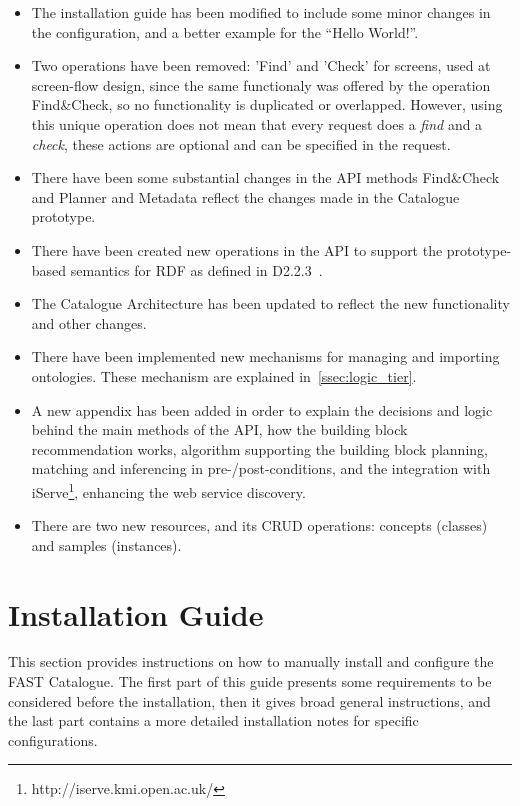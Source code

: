 \documentclass{fast_latex}
\begin{document}
\begin{itemize}
 \item The installation guide has been modified to include some minor changes in the configuration, and a better example for the ``Hello World!''.
 \item Two operations have been removed: 'Find' and 'Check' for screens, used at screen-flow design, since the same functionaly was offered by the operation Find\&Check, so no functionality is duplicated or overlapped. However, using this unique operation does not mean that every request does a \emph{find} and a \emph{check}, these actions are optional and can be specified in the request.
 \item There have been some substantial changes in the API methods Find\&Check and Planner and Metadata reflect the changes made in the Catalogue prototype.
 \item There have been created new operations in the API to support the prototype-based semantics for RDF as defined in D2.2.3~\cite{moeller2011fast_ontology}.
 \item The Catalogue Architecture has been updated to reflect the new functionality and other changes.
 \item There have been implemented new mechanisms for managing and importing ontologies. These mechanism are explained in~\ref{ssec:logic_tier}.
 \item A new appendix has been added in order to explain the decisions and logic behind the main methods of the API, how the building block recommendation works, algorithm supporting the building block planning, matching and inferencing in pre-/post-conditions, and the integration with iServe\footnote{http://iserve.kmi.open.ac.uk/}, enhancing the web service discovery.
 \item There are two new resources, and its CRUD operations: concepts (classes) and samples (instances).
\end{itemize}



\clearpage
\section{Installation Guide} %
\label{sec:installation_guide}

This section provides instructions on how to manually install and configure the FAST Catalogue. The first part of this guide presents some requirements to be considered before the installation, then it gives broad general instructions, and the last part contains a more detailed installation notes for specific configurations.
\end{document}
